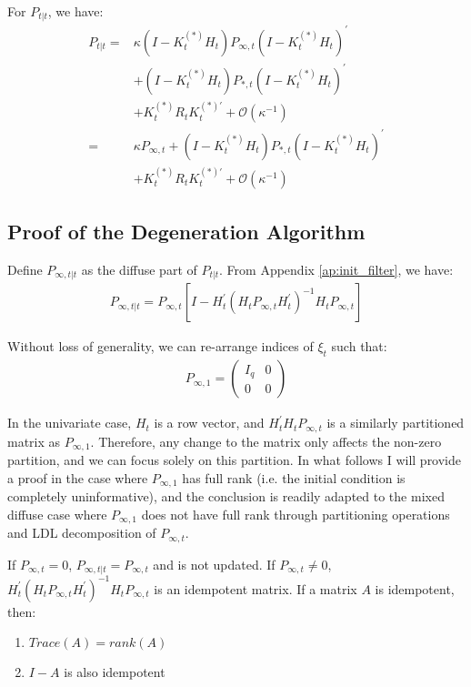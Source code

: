 \documentclass[10pt]{article}
\newenvironment{boenumerate}
    {\begin{enumerate}\renewcommand\labelenumi{\textbf\theenumi}}
    {\end{enumerate}}
\numberwithin{equation}{section}
\begin{document}
For $P_{t|t}$, we have:
\begin{align}
    P_{t|t} =& \kappa (I-K_t^{(*)}H_t)P_{\infty,t}(I-K_t^{(*)}H_t)^{'} \nonumber \\
    &+ (I-K_t^{(*)}H_t)P_{*,t}(I-K_t^{(*)}H_t)^{'} \nonumber \\
    &+ K_t^{(*)}R_tK_t^{(*)'} + \mathcal{O}(\kappa^{-1}) \nonumber \\
    =& \kappa P_{\infty, t} + (I-K_t^{(*)}H_t)P_{*,t}(I-K_t^{(*)}H_t)^{'} \label{eq:diff_P2} \\
    &+ K_t^{(*)}R_tK_t^{(*)'} + \mathcal{O}(\kappa^{-1}) \nonumber
\end{align}

\subsection{Proof of the Degeneration Algorithm} \label{ap:transition}
Define $P_{\infty,t|t}$ as the diffuse part of $P_{t|t}$. From Appendix \ref{ap:init_filter}, we have:
\begin{align*}
    P_{\infty,t|t} = P_{\infty,t}[I - H_t^{'}(H_tP_{\infty,t}H_t^{'})^{-1}H_tP_{\infty,t}]
\end{align*}

Without loss of generality, we can re-arrange indices of $\xi_t$ such that:
\begin{align*}
    P_{\infty,1}=\begin{pmatrix}
        I_q & 0 \\
        0 & 0
    \end{pmatrix}
\end{align*}

In the univariate case, $H_t$ is a row vector, and $H_t^{'}H_tP_{\infty,t}$ is a similarly partitioned matrix as $P_{\infty, 1}$. Therefore, any change to the matrix only affects the non-zero partition, and we can focus solely on this partition. In what follows I will provide a proof in the case where $P_{\infty,1}$ has full rank (i.e. the initial condition is completely uninformative), and the conclusion is readily adapted to the mixed diffuse case where $P_{\infty,1}$ does not have full rank through partitioning operations and LDL decomposition of $P_{\infty,t}$. 

If $P_{\infty,t}=0$, $P_{\infty,t|t} = P_{\infty,t}$ and is not updated. If $P_{\infty,t}\neq0$, $H_t^{'}(H_tP_{\infty,t}H_t^{'})^{-1}H_tP_{\infty,t}$ is an idempotent matrix. If a matrix $A$ is idempotent, then:
\begin{boenumerate}
    \item $Trace(A)=rank(A)$
    \item $I-A$ is also idempotent
\end{boenumerate}
\end{document}

